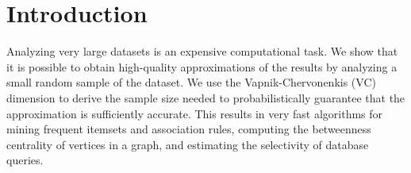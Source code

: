 \chapter{Introduction}\label{ch:intro}

 Analyzing very large datasets is an expensive
computational task. We show that it is possible to obtain high-quality
approximations of the results by analyzing a small random sample of the
dataset. We use the Vapnik-Chervonenkis (VC) dimension to derive the sample size
needed to probabilistically guarantee that the approximation is sufficiently
accurate. This results in very fast algorithms for mining frequent itemsets and
association rules, computing the betweenness centrality of vertices in a graph,
and estimating the selectivity of database queries.

